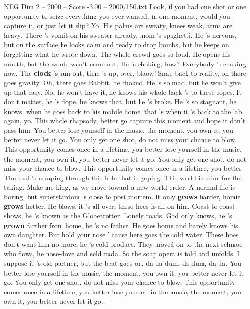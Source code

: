 \begin{textsample}{NEG Dim 2 – 2000 – Score -3.00 – 2000/150.txt}  \label{ex:f2_neg_032}
Look, if you had one shot or one opportunity to seize everything you ever wanted, in one moment, would you capture it, or just let it slip?
Yo.
His palms are sweaty, knees weak, arms are heavy.
There 's vomit on his sweater already, mom 's spaghetti.
He 's nervous, but on the surface he looks calm and ready to drop bombs, but he keeps on forgetting what he wrote down.
The whole crowd goes so loud.
He opens his mouth, but the words won't come out.
He 's choking, how?
Everybody 's choking now.
The \textbf{clock} 's run out, time 's up, over, blaow!
Snap back to reality, oh there goes gravity.
Oh, there goes Rabbit, he choked.
He 's so mad, but he won't give up that easy.
No, he won't have it, he knows his whole back 's to these ropes.
It don't matter, he 's dope, he knows that, but he 's broke.
He 's so stagnant, he knows, when he goes back to his mobile home, that 's when it 's back to the lab again, yo.
This whole rhapsody, better go capture this moment and hope it don't pass him.
You better lose yourself in the music, the moment, you own it, you better never let it go.
You only get one shot, do not miss your chance to blow.
This opportunity comes once in a lifetime, you better lose yourself in the music, the moment, you own it, you better never let it go.
You only get one shot, do not miss your chance to blow.
This opportunity comes once in a lifetime, you better The soul 's escaping through this hole that is gaping.
This world is mine for the taking.
Make me king, as we move toward a new world order.
A normal life is boring, but superstardom 's close to post mortem.
It only \textbf{grows} harder, homie \textbf{grows} hotter.
He blows, it 's all over, these hoes is all on him.
Coast to coast shows, he 's known as the Globetrotter.
Lonely roads, God only knows, he 's \textbf{grown} farther from home, he 's no father.
He goes home and barely knows his own daughter.
But hold your nose ' cause here goes the cold water.
These hoes don't want him no more, he 's cold product.
They moved on to the next schmoe who flows, he nose-dove and sold nada.
So the soap opera is told and unfolds, I suppose it 's old partner, but the beat goes on, da-da-dum, da-dum, da-da.
You better lose yourself in the music, the moment, you own it, you better never let it go.
You only get one shot, do not miss your chance to blow.
This opportunity comes once in a lifetime, you better lose yourself in the music, the moment, you own it, you better never let it go.

\end{textsample}
